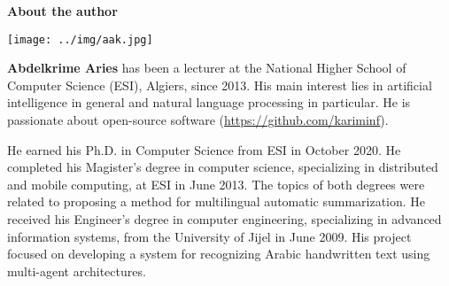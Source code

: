 \documentclass{KBook}
\begin{document}
\begin{tcolorbox}[colback=cyan,
	colframe=cyan,  
	arc=0pt,outer arc=0pt,
	valign=top, 
	halign=center,
	width=\textwidth]
	
	\color{white}
	\bfseries\LARGE About the author
	
\end{tcolorbox}\vspace{-.5cm}
\begin{tcolorbox}[colback=my-grey,
	colframe=my-grey,  
	center, arc=0pt,outer arc=0pt,
	valign=top, 
	halign=flush left,
	width=\textwidth]	
	
	\begin{minipage}[t]{0.15\textwidth}
		\texttt{[image: ../img/aak.jpg]}
	\end{minipage}
	\begin{minipage}[t]{0.01\textwidth}
	\end{minipage}
	\begin{minipage}[t]{0.80\textwidth}
		\normalsize\vspace*{-0.2\textwidth}
		\textbf{Abdelkrime Aries} has been a lecturer at the National Higher School of Computer Science (ESI), Algiers, since 2013. 
		His main interest lies in artificial intelligence in general and natural language processing in particular. 
		He is passionate about open-source software (\url{https://github.com/kariminf}).
		
		He earned his Ph.D. in Computer Science from ESI in October 2020. 
		He completed his Magister's degree in computer science, specializing in distributed and mobile computing, at ESI in June 2013. 
		The topics of both degrees were related to proposing a method for multilingual automatic summarization. 
		He received his Engineer's degree in computer engineering, specializing in advanced information systems, from the University of Jijel in June 2009. 
		His project focused on developing a system for recognizing Arabic handwritten text using multi-agent architectures.	
	\end{minipage}
	
	
\end{tcolorbox}
\end{document}
